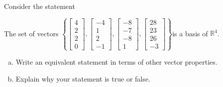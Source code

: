 
\begin{exerciseStatement}


Consider the statement 
\begin{center}\begin{minipage}{0.8\textwidth}
 The set of vectors \( \left\{ \left[\begin{array}{c}
4 \\
2 \\
2 \\
0
\end{array}\right] , \left[\begin{array}{c}
-4 \\
1 \\
2 \\
-1
\end{array}\right] , \left[\begin{array}{c}
-8 \\
-7 \\
-8 \\
1
\end{array}\right] , \left[\begin{array}{c}
28 \\
23 \\
26 \\
-3
\end{array}\right] \right\} \)is a basis of \(\mathbb{R}^4\). 
\end{minipage}\end{center}
    


\begin{enumerate}[(a)]
\item  Write an equivalent statement in terms of other vector properties.
\item  Explain why your statement is true or false.
\end{enumerate}
    
\end{exerciseStatement}
    
